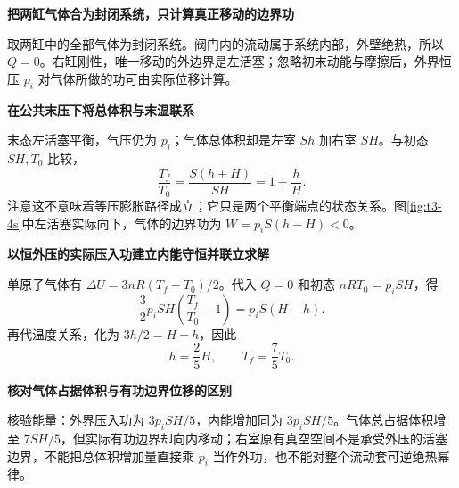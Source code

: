 \begin{solution}\textbf{把两缸气体合为封闭系统，只计算真正移动的边界功}\par\nobreak
取两缸中的全部气体为封闭系统。阀门内的流动属于系统内部，外壁绝热，所以 $Q=0$。右缸刚性，唯一移动的外边界是左活塞；忽略初末动能与摩擦后，外界恒压 $p_i$ 对气体所做的功可由实际位移计算。


\par\medskip{}\noindent\textbf{在公共末压下将总体积与末温联系}\par\nobreak
末态左活塞平衡，气压仍为 $p_i$；气体总体积却是左室 $Sh$ 加右室 $SH$。与初态 $SH,T_0$ 比较，
\[\frac{T_f}{T_0}=\frac{S(h+H)}{SH}=1+\frac hH.\]
注意这不意味着等压膨胀路径成立；它只是两个平衡端点的状态关系。图\ref{fig:t3-4s}中左活塞实际向下，气体的边界功为 $W=p_iS(h-H)<0$。



\par\medskip{}\noindent\textbf{以恒外压的实际压入功建立内能守恒并联立求解}\par\nobreak
单原子气体有 $\Delta U=3nR(T_f-T_0)/2$。代入 $Q=0$ 和初态 $nRT_0=p_iSH$，得
\[\frac32p_iSH\left(\frac{T_f}{T_0}-1\right)=p_iS(H-h).\]
再代温度关系，化为 $3h/2=H-h$，因此
\[\boxed{h=\frac25H,\qquad T_f=\frac75T_0}.\]


\par\medskip{}\noindent\textbf{核对气体占据体积与有功边界位移的区别}\par\nobreak
核验能量：外界压入功为 $3p_iSH/5$，内能增加同为 $3p_iSH/5$。气体总占据体积增至 $7SH/5$，但实际有功边界却向内移动；右室原有真空空间不是承受外压的活塞边界，不能把总体积增加量直接乘 $p_i$ 当作外功，也不能对整个流动套可逆绝热幂律。
\end{solution}
